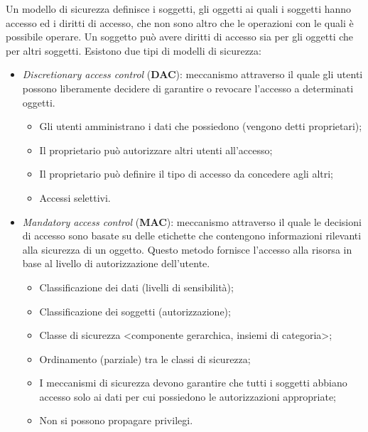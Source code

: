 Un modello di sicurezza definisce i soggetti, gli oggetti ai quali i soggetti
hanno accesso ed i diritti
di accesso, che non sono altro che le operazioni con le quali è possibile
operare. Un soggetto può
avere diritti di accesso sia per gli oggetti che per altri soggetti.
Esistono due tipi di modelli di sicurezza:
\begin{itemize}
    \item \textit{Discretionary access control} (\textbf{DAC}): meccanismo
          attraverso il quale gli utenti possono
          liberamente decidere di garantire o revocare l'accesso a determinati
          oggetti.
          \begin{itemize}
              \item Gli utenti amministrano i dati che possiedono (vengono
                    detti proprietari);
              \item Il proprietario può autorizzare altri utenti all'accesso;
              \item Il proprietario può definire il tipo di accesso da
                    concedere agli altri;
              \item Accessi selettivi.
          \end{itemize}
    \item \textit{Mandatory access control} (\textbf{MAC}): meccanismo
          attraverso il quale le decisioni di accesso
          sono basate su delle etichette che contengono informazioni
          rilevanti alla sicurezza di un
          oggetto. Questo metodo fornisce l'accesso alla risorsa in base al
          livello di autorizzazione dell'utente.
          \begin{itemize}
              \item Classificazione dei dati (livelli di sensibilità);
              \item Classificazione dei soggetti (autorizzazione);
              \item Classe di sicurezza <componente gerarchica, insiemi di
                    categoria>;
              \item Ordinamento (parziale) tra le classi di sicurezza;
              \item I meccanismi di sicurezza devono garantire che tutti i
                    soggetti abbiano accesso solo
                    ai dati per cui possiedono le autorizzazioni appropriate;
              \item Non si possono propagare privilegi.
          \end{itemize}
\end{itemize}

